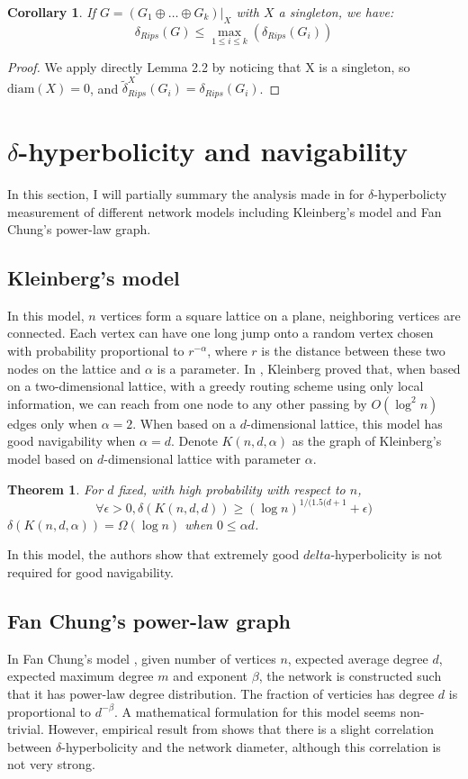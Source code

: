 \documentclass[a4paper,12pt]{article}
\newtheorem{theorem}{Theorem}[section]
\newtheorem{corollary}{Corollary}[theorem]
\begin{document}
\begin{corollary}
    If $G = (G_1 \oplus \ldots \oplus G_k)|_X$ with $X$ a singleton, we have:
    $$\delta_{Rips}(G) \leq \max_{1 \leq i \leq k}(\delta_{Rips}(G_i)) $$
\end{corollary}

\begin{proof}
    We apply directly Lemma 2.2 by noticing that X is a singleton, so $\mbox{diam}(X) = 0$, and $\tilde{\delta}_{Rips}^X (G_i) = \delta_{Rips} (G_i)$.
\end{proof}

\section{$\delta$-hyperbolicity and navigability}
In this section, I will partially summary the analysis made in \cite{1} for $\delta$-hyperbolicty measurement of different network models including Kleinberg's model and Fan Chung's power-law graph.

\subsection{Kleinberg's model}
In this model, $n$ vertices form a square lattice on a plane, neighboring vertices are connected. Each vertex can have one long jump onto a random vertex chosen with probability proportional to $r^{-\alpha}$, where $r$ is the distance between these two nodes on the lattice and $\alpha$ is a parameter. In \cite{14}, Kleinberg proved that, when based on a two-dimensional lattice, with a greedy routing scheme using only local information, we can reach from one node to any other passing by
$O(\log^2 n)$ edges only when $\alpha = 2$. When based on a $d$-dimensional lattice, this model has good navigability when $\alpha = d$. Denote $K(n,d,\alpha)$ as the graph of Kleinberg's model based on $d$-dimensional lattice with parameter $\alpha$.

\begin{theorem}
    For $d$ fixed, with high probability with respect to $n$,
    $$\forall \epsilon > 0, \delta(K(n,d,d)) \geq (\log n)^{1/(1.5(d+1}+\epsilon)$$
    $\delta(K(n,d,\alpha)) = \Omega(\log n)$ when $0 \leq \alpha d$.
\end{theorem}

In this model, the authors show that extremely good $delta$-hyperbolicity is not required for good navigability.

\subsection{Fan Chung's power-law graph}
In Fan Chung's model \cite{8}, given number of vertices $n$, expected average degree $d$, expected maximum degree $m$ and exponent $\beta$, the network is constructed such that it has power-law degree distribution. The fraction of verticies has degree $d$ is proportional to $d^{-\beta}$. A mathematical formulation for this model seems non-trivial. However, empirical result from \cite{1} shows that there is a slight correlation between $\delta$-hyperbolicity and the network
diameter, although this correlation is not very strong.
\end{document}
